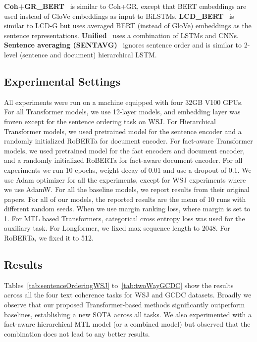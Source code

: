 \documentclass[11pt]{article}
\begin{document}
\textbf{Coh+GR\_BERT}~\cite{farag2020analyzing} is similar to Coh+GR, except that BERT embeddings are used instead of GloVe embeddings as input to BiLSTMs. 
\textbf{LCD\_BERT}~\cite{farag2020analyzing} is similar to LCD-G but uses averaged BERT (instead of GloVe) embeddings as the sentence representations.  \textbf{Unified}~\cite{moon2019unified} uses a combination of LSTMs and CNNs.   \textbf{Sentence averaging (SENTAVG)}~\cite{lai2018discourse} ignores sentence order and is similar to 2-level (sentence and document) hierarchical LSTM.



\subsection{Experimental Settings}
All experiments were run on a machine equipped with four 32GB V100 GPUs. For all Transformer models, we use 12-layer models, and embedding layer was frozen except for the sentence ordering task on WSJ. For Hierarchical Transformer models, we used pretrained model for the sentence encoder and a randomly initialized RoBERTa for document encoder. For fact-aware Transformer models, we used pretrained model for the fact encoders and document encoder, and a randomly initialized RoBERTa for fact-aware document encoder. 
For all experiments we run 10 epochs, weight decay of 0.01 and use a dropout of 0.1. We use Adam optimizer for all the experiments, except for WSJ experiments where we use AdamW. For all the baseline models, we report results from their original papers. For all of our models, the reported results are the mean of 10 runs with different random seeds. When we use margin ranking loss, where margin is set to 1. For MTL based Transformers,  categorical cross entropy loss was used for the auxiliary task. For Longformer, we fixed max sequence length to 2048. For RoBERTa, we fixed it to 512.

\subsection{Results}
Tables~\ref{tab:sentenceOrderingWSJ} to~\ref{tab:twoWayGCDC} show the results across all the four text coherence tasks for WSJ and GCDC datasets. Broadly we observe that our proposed Transformer-based methods significantly outperform baselines, establishing a new SOTA across all tasks. We also experimented with a fact-aware hierarchical MTL model (or a combined model) but observed that the combination does not lead to any better results. 
\end{document}
